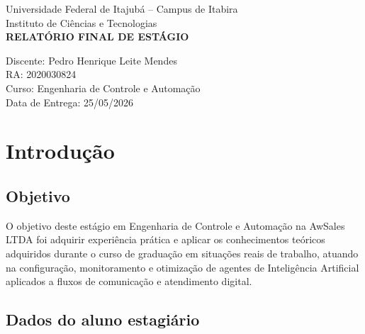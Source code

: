 \documentclass[12pt,a4paper,oneside]{article}
\begin{document}
\begin{center}
{\large Universidade Federal de Itajubá -- Campus de Itabira\\[0.4cm]
Instituto de Ciências e Tecnologias}\\[3cm]

{\Huge\bfseries RELATÓRIO FINAL DE ESTÁGIO}\\[3cm]

\begin{flushleft}
Discente: Pedro Henrique Leite Mendes\\
RA: 2020030824\\
Curso: Engenharia de Controle e Automação\\
Data de Entrega: 25/05/2026
\end{flushleft}
\end{center}

\thispagestyle{empty}
\clearpage

\renewcommand{\contentsname}{Conteúdo}
\tableofcontents
\thispagestyle{empty}
\clearpage

\setcounter{page}{1}

\section{Introdução}

\subsection{Objetivo}

O objetivo deste estágio em Engenharia de Controle e Automação na AwSales LTDA foi adquirir experiência prática e aplicar os conhecimentos teóricos adquiridos durante o curso de graduação em situações reais de trabalho, atuando na configuração, monitoramento e otimização de agentes de Inteligência Artificial aplicados a fluxos de comunicação e atendimento digital.

\subsection{Dados do aluno estagiário}
\end{document}

